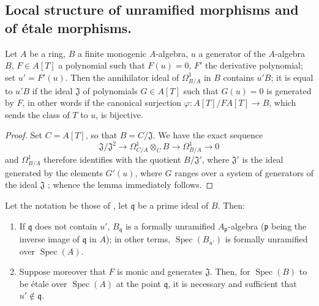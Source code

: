\subsection{Local structure of unramified morphisms and of \'etale morphisms.}
\label{subsection:IV.18.4}


\begin{lemma}[18.4.1]
\label{IV.18.4.1}
Let $A$ be a ring, $B$ a finite monogenic $A$-algebra, $u$ a generator of the $A$-algebra $B$, $F\in A[T]$ a polynomial such that $F(u)=0$, $F'$ the derivative polynomial;
set $u'=F'(u)$.
Then the annihilator ideal of $\Omega^1_{B/A}$ in $B$ contains $u'B$;
it is equal to $u'B$ if the ideal $\mathfrak{J}$ of polynomials $G\in A[T]$ such that $G(u)=0$ is generated by $F$, in other words if the canonical surjection $\varphi:A[T]/F A[T]\to B$, which sends the class of $T$ to $u$, is bijective.
\end{lemma}

\begin{proof}
Set $C=A[T]$, so that $B=C/\mathfrak{J}$.
We have the exact sequence 
\[
\mathfrak{J}/\mathfrak{J}^2\to\Omega^1_{C/A}\otimes_C B\to\Omega^1_{B/A}\to 0
\]
and $\Omega^1_{B/A}$ therefore identifies with the quotient $B/\mathfrak{J}'$, where $\mathfrak{J}'$ is the ideal generated by the elements $G'(u)$, where $G$ ranges over a system of generators of the ideal $\mathfrak{J}$ ;
whence the lemma immediately follows.
\end{proof}

\begin{proposition}[18.4.2]
\label{IV.18.4.2}
Let the notation be those of , let $\mathfrak{q}$ be a prime ideal of $B$.
Then:
\begin{enumerate}
  \item[\textup{(i)}] If $\mathfrak{q}$ does not contain $u'$, $B_\mathfrak{q}$ is a formally unramified $A_\mathfrak{p}$-algebra \textup{(}$\mathfrak{p}$ being the inverse image of $\mathfrak{q}$ in $A$\textup{)};
in other terms, $\operatorname{Spec}(B_{u'})$ is formally unramified over $\operatorname{Spec}(A)$.
  \item[\textup{(ii)}] Suppose moreover that $F$ is monic and generates $\mathfrak{J}$.
Then, for $\operatorname{Spec}(B)$ to be \'etale over $\operatorname{Spec}(A)$ at the point $\mathfrak{q}$, it is necessary and sufficient that $u'\notin\mathfrak{q}$.
\end{enumerate}
\end{proposition}

